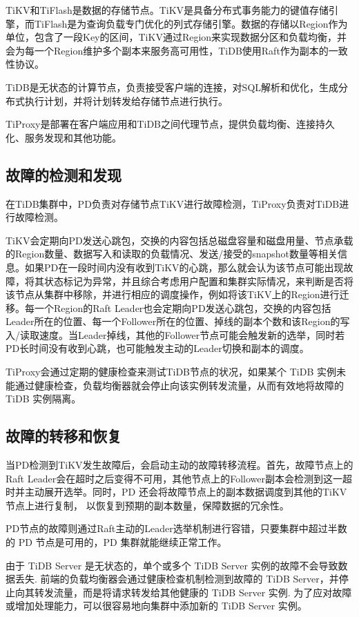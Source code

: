 TiKV和TiFlash是数据的存储节点。TiKV是具备分布式事务能力的键值存储引擎，而TiFlash是为查询负载专门优化的列式存储引擎。数据的存储以Region作为单位，包含了一段Key的区间，TiKV通过Region来实现数据分区和负载均衡，并会为每一个Region维护多个副本来服务高可用性，TiDB使用Raft作为副本的一致性协议。

TiDB是无状态的计算节点，负责接受客户端的连接，对SQL解析和优化，生成分布式执行计划，并将计划转发给存储节点进行执行。

TiProxy是部署在客户端应用和TiDB之间代理节点，提供负载均衡、连接持久化、服务发现和其他功能。


\subsection{故障的检测和发现}

在TiDB集群中，PD负责对存储节点TiKV进行故障检测，TiProxy负责对TiDB进行故障检测。

TiKV会定期向PD发送心跳包，交换的内容包括总磁盘容量和磁盘用量、节点承载的Region数量、数据写入和读取的负载情况、发送/接受的snapshot数量等相关信息。如果PD在一段时间内没有收到TiKV的心跳，那么就会认为该节点可能出现故障，将其状态标记为异常，并且综合考虑用户配置和集群实际情况，来判断是否将该节点从集群中移除，并进行相应的调度操作，例如将该TiKV上的Region进行迁移。每一个Region的Raft Leader也会定期向PD发送心跳包，交换的内容包括Leader所在的位置、每一个Follower所在的位置、掉线的副本个数和该Region的写入/读取速度。当Leader掉线，其他的Follower节点可能会触发新的选举，同时若PD长时间没有收到心跳，也可能触发主动的Leader切换和副本的调度。


TiProxy会通过定期的健康检查来测试TiDB节点的状况，如果某个 TiDB 实例未能通过健康检查，负载均衡器就会停止向该实例转发流量，从而有效地将故障的 TiDB 实例隔离。



\subsection{故障的转移和恢复}

当PD检测到TiKV发生故障后，会启动主动的故障转移流程。首先，故障节点上的Raft Leader会在超时之后变得不可用，其他节点上的Follower副本会检测到这一超时并主动展开选举。同时，PD 还会将故障节点上的副本数据调度到其他的TiKV节点上进行复制，
以恢复到预期的副本数量，保障数据的冗余性。

PD节点的故障则通过Raft主动的Leader选举机制进行容错，只要集群中超过半数的 PD 节点是可用的，PD 集群就能继续正常工作。

由于 TiDB Server 是无状态的，单个或多个 TiDB Server 实例的故障不会导致数据丢失. 前端的负载均衡器会通过健康检查机制检测到故障的 TiDB Server，并停止向其转发流量，而是将请求转发给其他健康的 TiDB Server 实例. 为了应对故障或增加处理能力，可以很容易地向集群中添加新的 TiDB Server 实例。

